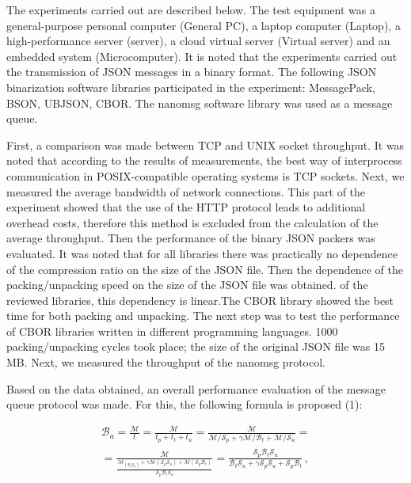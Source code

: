 The experiments carried out are described below. The test equipment was a general-purpose personal computer (General PC), a laptop computer (Laptop), a high-performance server (server), a cloud virtual server (Virtual server) and an embedded system (Microcomputer). It is noted that the experiments carried out the transmission of JSON messages in a binary format. The following JSON binarization software libraries participated in the experiment: MessagePack, BSON, UBJSON, CBOR. The nanomsg software library was used as a message queue.

First, a comparison was made between TCP and UNIX socket throughput. It was noted that according to the results of measurements, the best way of interprocess communication in POSIX-compatible operating systems is TCP sockets. Next, we measured the average bandwidth of network connections. This part of the experiment showed that the use of the HTTP protocol leads to additional overhead costs, therefore this method is excluded from the calculation of the average throughput. Then the performance of the binary JSON packers was evaluated. It was noted that for all libraries there was practically no dependence of the compression ratio on the size of the JSON file. Then the dependence of the packing/unpacking speed on the size of the JSON file was obtained. of the reviewed libraries, this dependency is linear.The CBOR library showed the best time for both packing and unpacking.
The next step was to test the performance of CBOR libraries written in different programming languages. 1000 packing/unpacking cycles took place; the size of the original JSON file was 15 MB. Next, we measured the throughput of the nanomsg protocol.

Based on the data obtained, an overall performance evaluation of the message queue protocol was made. For this, the following formula is proposed (1):

\begin{equation}
\begin{split}
\label{eq: example}
\mathcal{B} _a = \frac{\mathcal{M}}{t}
= \frac{\mathcal{M}}{t_p + t_t + t_u}
= \frac{\mathcal{M}}
{\mathcal{M}/\mathcal{S} _p +
	\gamma \mathcal{M}/\mathcal{B} _t +
	\mathcal{M}/\mathcal{S} _u} = \\
= \frac{\mathcal{M}}
{\frac{\mathcal{M} _ (\mathcal{B} _t \mathcal{S} _u) +
		\gamma
		\mathcal{M} (\mathcal{S} _p \mathcal{S} _u) +
		\mathcal{M} (\mathcal{S} _p \mathcal{B} _t)}
	{\mathcal{S} _p \mathcal{B} _t \mathcal{S} _u}
}
= \frac{\mathcal{S} _p \mathcal{B} _t \mathcal{S} _u}
{\mathcal{B} _t \mathcal{S} _u + \gamma \mathcal{S} _p \mathcal{S} _u + \mathcal{S} _p \mathcal{B} _t} \,,
\end{split}
\end{equation}

